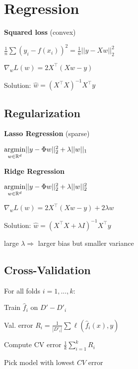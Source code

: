\section*{Regression}

\textbf{Squared loss} \quad (convex)

\qquad \qquad $\frac{1}{n}\sum (y_i - f(x_i))^2 = \frac{1}{n}||y - X w||_2^2$

\qquad \qquad $\nabla_w L(w) = 2X^\top(Xw -y)$

Solution: $\hat{w} = (X^\top X)^{-1}X^\top y$

\subsection*{Regularization}

\textbf{Lasso Regression} \quad (sparse)

\qquad \qquad $\underset{w \in \mathbb{R}^d}{\text{argmin}} ||y - \Phi w||_2^2 + \lambda ||w||_1$

\textbf{Ridge Regression}

\qquad \qquad $\underset{w \in \mathbb{R}^d}{\text{argmin}} ||y - \Phi w||_2^2 + \lambda ||w||_2^2$

\qquad \qquad $\nabla_w L(w) = 2X^\top(Xw -y) + 2 \lambda w$

Solution: $\hat w = (X^\top X + \lambda I)^{-1} X^\top y$

large $\lambda \Rightarrow$ larger bias but smaller variance 

\subsection*{Cross-Validation}

\begin{compactitem}
	\item For all folds $i = 1,..., k$: 
		\begin{compactitem}
			\item Train $\hat{f}_i$ on $D' - D'_i$
			\item Val. error $R_i = \frac{1}{|D'_i|} \sum \ell(\hat{f}_i(x), y)$
		\end{compactitem}
	\item Compute CV error $\frac{1}{k} \sum_{i=1}^k R_i$
	\item Pick model with lowest $CV$ error
\end{compactitem}